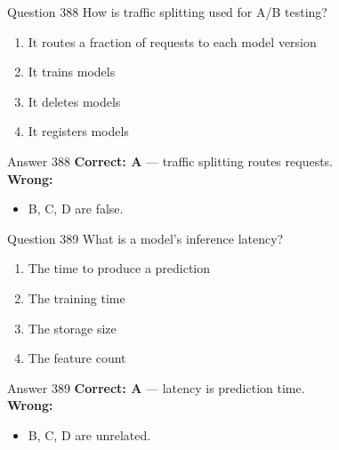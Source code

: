 \documentclass[aspectratio=169,11pt]{beamer}
\begin{document}
	\begin{frame}{Question 388}
		How is traffic splitting used for A/B testing?
		\begin{enumerate}[label=\Alph*.]
			\item It routes a fraction of requests to each model version
			\item It trains models
			\item It deletes models
			\item It registers models
		\end{enumerate}
	\end{frame}
	\begin{frame}{Answer 388}
		\textbf{Correct: A} --- traffic splitting routes requests.\\
		\vspace{0.5em}
		\textbf{Wrong:}
		\begin{itemize}
			\item B, C, D are false.
		\end{itemize}
	\end{frame}
	
	\begin{frame}{Question 389}
		What is a model's inference latency?
		\begin{enumerate}[label=\Alph*.]
			\item The time to produce a prediction
			\item The training time
			\item The storage size
			\item The feature count
		\end{enumerate}
	\end{frame}
	\begin{frame}{Answer 389}
		\textbf{Correct: A} --- latency is prediction time.\\
		\vspace{0.5em}
		\textbf{Wrong:}
		\begin{itemize}
			\item B, C, D are unrelated.
		\end{itemize}
	\end{frame}
	
\end{document}
